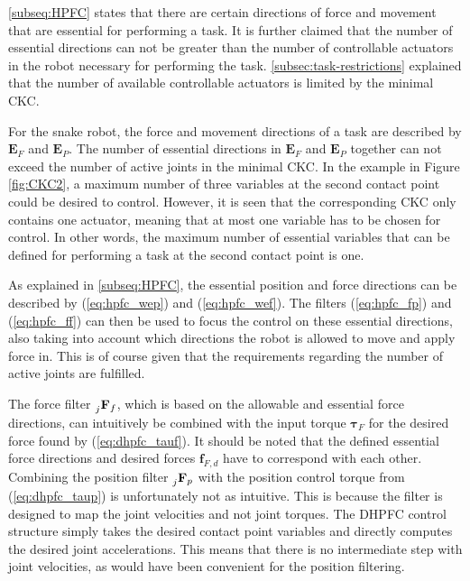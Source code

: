 \ref{subseq:HPFC} states that there are certain directions of force and movement that are essential for performing a task. It is further claimed that the number of essential directions can not be greater than the number of controllable actuators in the robot necessary for performing the task. \ref{subsec:task-restrictions} explained that the number of available controllable actuators is limited by the minimal CKC.

For the snake robot, the force and movement directions of a task are described by $\mathbf{E}_F$ and $\mathbf{E}_P$.
The number of essential directions in $\mathbf{E}_F$ and $\mathbf{E}_P$ together can not exceed the number of active joints in the minimal CKC. In the example in Figure \ref{fig:CKC2}, a maximum number of three variables at the second contact point could be desired to control. However, it is seen that the corresponding CKC only contains one actuator, meaning that at most one variable has to be chosen for control. In other words, the maximum number of essential variables that can be defined for performing a task at the second contact point is one.

As explained in \ref{subseq:HPFC}, the essential position and force directions can be described by (\ref{eq:hpfc_wep}) and (\ref{eq:hpfc_wef}). The filters (\ref{eq:hpfc_fp}) and (\ref{eq:hpfc_ff}) can then be used to focus the control on these essential directions, also taking into account which directions the robot is allowed to move and apply force in. This is of course given that the requirements regarding the number of active joints are fulfilled.

The force filter $\prescript{}{j}{\mathbf{F}}_{f}$, which is based on the allowable and essential force directions, can intuitively be combined with the input torque $\boldsymbol{\tau}_F$ for the desired force found by (\ref{eq:dhpfc_tauf}). It should be noted that the defined essential force directions and desired forces $\mathbf{f}_{F,d}$ have to correspond with each other. Combining the position filter $\prescript{}{j}{\mathbf{F}}_{p}$ with the position control torque from (\ref{eq:dhpfc_taup}) is unfortunately not as intuitive. This is because the filter is designed to map the joint velocities and not joint torques. The DHPFC control structure simply takes the desired contact point variables and directly computes the desired joint accelerations. This means that there is no intermediate step with joint velocities, as would have been convenient for the position filtering.

